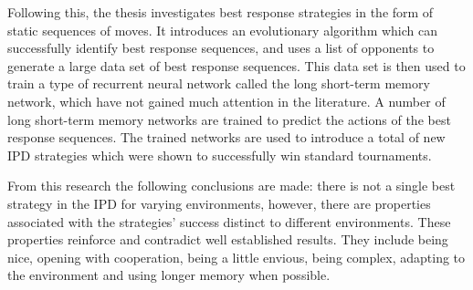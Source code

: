 Following this, the thesis investigates best response strategies in the form of
static sequences of moves. It introduces an evolutionary algorithm which can
successfully identify best response sequences, and uses a list of
\numberofstrategiesbestsequences opponents to generate a large data set of best
response sequences. This data set is then used to train a type of recurrent
neural network called the long short-term memory network, which have not gained
much attention in the literature. A number of long short-term memory networks
are trained to predict the actions of the best response sequences. The trained
networks are used to introduce a total of \lstmstrategies new IPD strategies which were shown
to successfully win standard tournaments.

From this research the following conclusions are made: there is not a single
best strategy in the IPD for varying environments, however, there are properties
associated with the strategies' success distinct to different environments.
These properties reinforce and contradict well established results. They include
being nice, opening with cooperation, being a little envious, being complex,
adapting to the environment and using longer memory when possible.